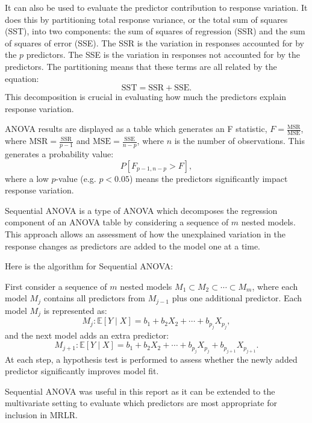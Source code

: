 \documentclass[11pt]{report} %
\begin{document}
It can also be used to evaluate the predictor contribution to response variation. It does this by partitioning total response variance, or the total sum of squares (SST), into two components: the sum of squares of regression (SSR) and the sum of squares of error (SSE). The SSR is the variation in responses accounted for by the $p$ predictors. The SSE is the variation in responses not accounted for by the predictors. The partitioning means that these terms are all related by the equation:
\begin{equation*}
    \text{SST} = \text{SSR} + \text{SSE}.
\end{equation*}
\noindent This decomposition is crucial in evaluating how much the predictors explain response variation. 

ANOVA results are displayed as a table which generates an F statistic, $F = \frac{\text{MSR}}{\text{MSE}}$, where $\text{MSR} = \frac{\text{SSR}}{p-1}$ and $\text{MSE} = \frac{\text{SSE}}{n-p}$, where $n$ is the number of observations. This generates a probability value:
\[
P[F_{p-1, n-p} > F],
\]
where a low $p$-value (e.g. $p< 0.05$) means the predictors significantly impact response variation.

Sequential ANOVA is a type of ANOVA which decomposes the regression component of an ANOVA table by considering a sequence of $m$ nested models. This approach allows an assessment of how the unexplained variation in the response changes as predictors are added to the model one at a time.

\noindent Here is the algorithm for Sequential ANOVA:

First consider a sequence of \( m \) nested models \( M_1 \subset M_2 \subset \cdots \subset M_m \), where each model \( M_j \) contains all predictors from \( M_{j-1} \) plus one additional predictor. Each model \( M_j \) is represented as:
\[
M_j : \mathbb{E}[Y \mid X] = b_1 + b_2 X_2 + \cdots + b_{p_j} X_{p_j},
\]
\vspace{-0.3cm}
and the next model adds an extra predictor:
\[
M_{j+1} : \mathbb{E}[Y \mid X] = b_1 + b_2 X_2 + \cdots + b_{p_j} X_{p_j} + b_{p_{j+1}} X_{p_{j+1}}.
\]
At each step, a hypothesis test is performed to assess whether the newly added predictor significantly improves model fit.

Sequential ANOVA was useful in this report as it can be extended to the multivariate setting to evaluate which predictors are most appropriate for inclusion in MRLR.

\vspace{-0.3cm}
\end{document}
